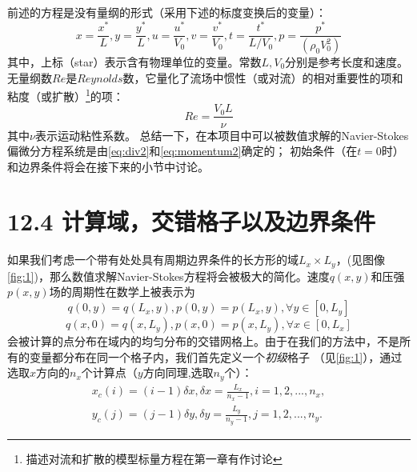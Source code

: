 \documentclass[nofonts]{ctexart} %
\begin{document}
 前述的方程是没有量纲的形式（采用下述的标度变换后的变量）：
\begin{equation}
x=\frac{x^*}{L},y=\frac{y^*}{L},u=\frac{u^*}{V_0},v=\frac{v^*}{V_0},t=\frac{t^*}{L/V_0}, p=\frac{p^*}{(\rho_0 V_0^2)}
\end{equation}
其中，上标（star）表示含有物理单位的变量。常数$L,V_0$分别是参考长度和速度。无量纲数$Re$是$Reynolds$数，它量化了流场中惯性（或对流）的相对重要性的项和粘度（或扩散）\footnote{描述对流和扩散的模型标量方程在第一章有作讨论}的项：
\begin{equation}
Re=\frac{V_0 L}{\nu}    
\end{equation}
其中$\nu$表示运动粘性系数。
总结一下，在本项目中可以被数值求解的Navier-Stokes偏微分方程系统是由\ref{eq:div2}和\ref{eq:momentum2}确定的；
初始条件（在$t=0$时）和边界条件将会在接下来的小节中讨论。
\section{12.4 计算域，交错格子以及边界条件}
如果我们考虑一个带有处处具有周期边界条件的长方形的域$L_x \times L_y$，(见图像\ref{fig:1})，那么数值求解Navier-Stokes方程将会被极大的简化。速度$q(x,y)$和压强$p(x,y)$场的周期性在数学上被表示为
\begin{equation}
q(0,y)=q(L_x,y),p(0,y)=p(L_x,y), \forall y\in [0,L_y]
\end{equation}
\begin{equation}
q(x,0)=q(x,L_y),p(x,0)=p(x,L_y), \forall x\in [0,L_x]
\end{equation}
会被计算的点分布在域内的均匀分布的交错网格上。由于在我们的方法中，不是所有的变量都分布在同一个格子内，我们首先定义一个\textit{初级}格子
（见\ref{fig:1}），通过选取$x$方向的$n_x$个计算点（$y$方向同理,选取$n_y$个）：
\begin{align}
    x_c(i)=(i-1)\delta x, \delta x=\frac{L_x}{n_x-1}, i=1,2,...,n_x,\\
    y_c(j)=(j-1)\delta y, \delta y=\frac{L_y}{n_y-1}, j=1,2,...,n_y.
\end{align}
\end{document}
